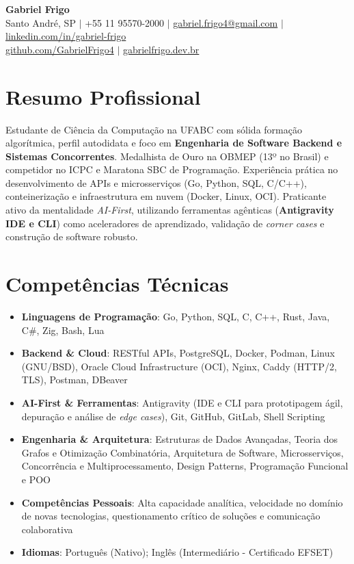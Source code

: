 \documentclass[letterpaper,10pt]{article}
\newcommand{\resumeItem}[1]{\item\small{#1}}
\newcommand{\resumeSubHeadingList}{\begin{itemize}[leftmargin=0.15in, label={}]}
\newcommand{\resumeSubHeadingListEnd}{\end{itemize}}
\begin{document}
\begin{center}
  \textbf{\Huge Gabriel Frigo} \\
  \small Santo André, SP $|$ +55 11 95570-2000 $|$ \href{mailto:gabriel.frigo4@gmail.com}{gabriel.frigo4@gmail.com} $|$
  \href{https://linkedin.com/in/gabriel-frigo-b6727b275/}{linkedin.com/in/gabriel-frigo} \\
  \href{https://github.com/GabrielFrigo4}{github.com/GabrielFrigo4} $|$
  \href{https://gabrielfrigo.dev.br}{gabrielfrigo.dev.br}
\end{center}

\section{Resumo Profissional}
Estudante de Ciência da Computação na UFABC com sólida formação algorítmica, perfil autodidata e foco em \textbf{Engenharia de Software Backend e Sistemas Concorrentes}. Medalhista de Ouro na OBMEP (13º no Brasil) e competidor no ICPC e Maratona SBC de Programação. Experiência prática no desenvolvimento de APIs e microsserviços (Go, Python, SQL, C/C++), conteinerização e infraestrutura em nuvem (Docker, Linux, OCI). Praticante ativo da mentalidade \textit{AI-First}, utilizando ferramentas agênticas (\textbf{Antigravity IDE e CLI}) como aceleradores de aprendizado, validação de \textit{corner cases} e construção de software robusto.

\section{Competências Técnicas}
\resumeSubHeadingList
  \resumeItem{\textbf{Linguagens de Programação}: Go, Python, SQL, C, C++, Rust, Java, C\#, Zig, Bash, Lua}
  \resumeItem{\textbf{Backend \& Cloud}: RESTful APIs, PostgreSQL, Docker, Podman, Linux (GNU/BSD), Oracle Cloud Infrastructure (OCI), Nginx, Caddy (HTTP/2, TLS), Postman, DBeaver}
  \resumeItem{\textbf{AI-First \& Ferramentas}: Antigravity (IDE e CLI para prototipagem ágil, depuração e análise de \textit{edge cases}), Git, GitHub, GitLab, Shell Scripting}
  \resumeItem{\textbf{Engenharia \& Arquitetura}: Estruturas de Dados Avançadas, Teoria dos Grafos e Otimização Combinatória, Arquitetura de Software, Microsserviços, Concorrência e Multiprocessamento, Design Patterns, Programação Funcional e POO}
  \resumeItem{\textbf{Competências Pessoais}: Alta capacidade analítica, velocidade no domínio de novas tecnologias, questionamento crítico de soluções e comunicação colaborativa}
  \resumeItem{\textbf{Idiomas}: Português (Nativo); Inglês (Intermediário - Certificado EFSET)}
\resumeSubHeadingListEnd
\end{document}
